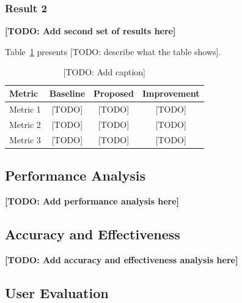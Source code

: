 \subsubsection{Result 2}

\textbf{[TODO: Add second set of results here]}

Table~\ref{tab:results} presents [TODO: describe what the table shows].

\begin{table}[H]
  \centering
  \caption{[TODO: Add caption]}
  \label{tab:results}
  \begin{tabular}{@{}lccc@{}}
    \toprule
    \textbf{Metric} & \textbf{Baseline} & \textbf{Proposed} & \textbf{Improvement} \\ \midrule
    Metric 1 & [TODO] & [TODO] & [TODO] \\
    Metric 2 & [TODO] & [TODO] & [TODO] \\
    Metric 3 & [TODO] & [TODO] & [TODO] \\ \bottomrule
  \end{tabular}
\end{table}

\subsection{Performance Analysis}


\textbf{[TODO: Add performance analysis here]}

\subsection{Accuracy and Effectiveness}


\textbf{[TODO: Add accuracy and effectiveness analysis here]}

\subsection{User Evaluation}


